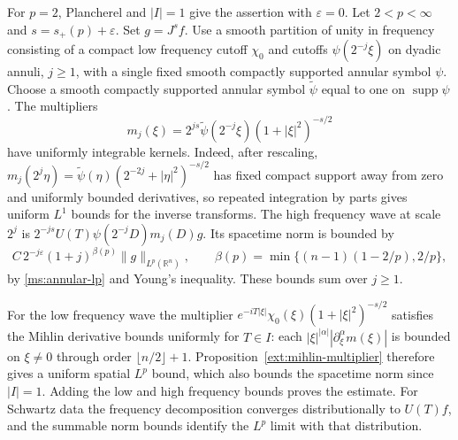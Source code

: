 For \(p=2\), Plancherel and \(|I|=1\) give the assertion with
\(\varepsilon=0\). Let \(2<p<\infty\) and
\(s=s_+(p)+\varepsilon\). Set \(g=J^s f\). Use a smooth
partition of unity in frequency consisting of a compact low
frequency cutoff \(\chi_0\) and cutoffs \(\psi(2^{-j}\xi)\)
on dyadic annuli, \(j\ge1\), with a single fixed smooth compactly
supported annular symbol \(\psi\). Choose a smooth compactly
supported annular symbol \(\widetilde\psi\) equal to one on
\(\operatorname{supp}\psi\).
The multipliers
\[
 m_j(\xi)=2^{js}\widetilde\psi(2^{-j}\xi)(1+|\xi|^2)^{-s/2}
\]
have uniformly integrable kernels. Indeed, after rescaling,
\(m_j(2^j\eta)=\widetilde\psi(\eta)(2^{-2j}+|\eta|^2)^{-s/2}\)
has fixed compact support away from zero and uniformly bounded
derivatives, so repeated integration by parts gives uniform
\(L^1\) bounds for the inverse transforms. The high frequency
wave at scale \(2^j\) is \(2^{-js}U(T)\psi(2^{-j}D)m_j(D)g\).
Its spacetime norm is bounded by
\[
 C\,2^{-j\varepsilon}(1+j)^{\beta(p)}\|g\|_{L^p(\mathbb R^n)},
 \qquad
 \beta(p)=\min\{(n-1)(1-2/p),2/p\},
\]
by \ref{ms:annular-lp} and Young's inequality. These bounds
sum over \(j\ge1\).

For the low frequency wave the multiplier
\(e^{-iT|\xi|}\chi_0(\xi)(1+|\xi|^2)^{-s/2}\) satisfies the
Mihlin derivative bounds uniformly for \(T\in I\): each
\(|\xi|^{|\alpha|}|\partial_\xi^\alpha m(\xi)|\) is bounded
on \(\xi\ne0\) through order \(\lfloor n/2\rfloor+1\).
Proposition~\ref{ext:mihlin-multiplier} therefore gives a uniform spatial \(L^p\)
bound, which also bounds the spacetime norm since
\(|I|=1\). Adding the low and high frequency bounds proves
the estimate. For Schwartz data the frequency decomposition
converges distributionally to \(U(T)f\), and the summable norm
bounds identify the \(L^p\) limit with that distribution.
